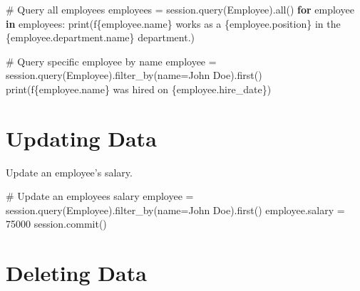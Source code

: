 \documentclass[
  letterpaper,
  DIV=11,
  numbers=noendperiod]{scrreprt}
\newenvironment{Shaded}{\begin{snugshade}}{\end{snugshade}}
\newcommand{\BuiltInTok}[1]{\textcolor[rgb]{0.00,0.23,0.31}{#1}}
\newcommand{\CommentTok}[1]{\textcolor[rgb]{0.37,0.37,0.37}{#1}}
\newcommand{\ControlFlowTok}[1]{\textcolor[rgb]{0.00,0.23,0.31}{\textbf{#1}}}
\newcommand{\DecValTok}[1]{\textcolor[rgb]{0.68,0.00,0.00}{#1}}
\newcommand{\KeywordTok}[1]{\textcolor[rgb]{0.00,0.23,0.31}{\textbf{#1}}}
\newcommand{\NormalTok}[1]{\textcolor[rgb]{0.00,0.23,0.31}{#1}}
\newcommand{\OperatorTok}[1]{\textcolor[rgb]{0.37,0.37,0.37}{#1}}
\newcommand{\SpecialCharTok}[1]{\textcolor[rgb]{0.37,0.37,0.37}{#1}}
\newcommand{\SpecialStringTok}[1]{\textcolor[rgb]{0.13,0.47,0.30}{#1}}
\newcommand{\StringTok}[1]{\textcolor[rgb]{0.13,0.47,0.30}{#1}}
\begin{document}
\begin{Shaded}
\begin{Highlighting}[]
\CommentTok{\# Query all employees}
\NormalTok{employees }\OperatorTok{=}\NormalTok{ session.query(Employee).}\BuiltInTok{all}\NormalTok{()}
\ControlFlowTok{for}\NormalTok{ employee }\KeywordTok{in}\NormalTok{ employees:}
    \BuiltInTok{print}\NormalTok{(}\SpecialStringTok{f\textquotesingle{}}\SpecialCharTok{\{}\NormalTok{employee}\SpecialCharTok{.}\NormalTok{name}\SpecialCharTok{\}}\SpecialStringTok{ works as a }\SpecialCharTok{\{}\NormalTok{employee}\SpecialCharTok{.}\NormalTok{position}\SpecialCharTok{\}}\SpecialStringTok{ in the }\SpecialCharTok{\{}\NormalTok{employee}\SpecialCharTok{.}\NormalTok{department}\SpecialCharTok{.}\NormalTok{name}\SpecialCharTok{\}}\SpecialStringTok{ department.\textquotesingle{}}\NormalTok{)}

\CommentTok{\# Query specific employee by name}
\NormalTok{employee }\OperatorTok{=}\NormalTok{ session.query(Employee).filter\_by(name}\OperatorTok{=}\StringTok{\textquotesingle{}John Doe\textquotesingle{}}\NormalTok{).first()}
\BuiltInTok{print}\NormalTok{(}\SpecialStringTok{f\textquotesingle{}}\SpecialCharTok{\{}\NormalTok{employee}\SpecialCharTok{.}\NormalTok{name}\SpecialCharTok{\}}\SpecialStringTok{ was hired on }\SpecialCharTok{\{}\NormalTok{employee}\SpecialCharTok{.}\NormalTok{hire\_date}\SpecialCharTok{\}}\SpecialStringTok{\textquotesingle{}}\NormalTok{)}
\end{Highlighting}
\end{Shaded}

\section{Updating Data}\label{updating-data-2}

Update an employee's salary.

\begin{Shaded}
\begin{Highlighting}[]
\CommentTok{\# Update an employee\textquotesingle{}s salary}
\NormalTok{employee }\OperatorTok{=}\NormalTok{ session.query(Employee).filter\_by(name}\OperatorTok{=}\StringTok{\textquotesingle{}John Doe\textquotesingle{}}\NormalTok{).first()}
\NormalTok{employee.salary }\OperatorTok{=} \DecValTok{75000}
\NormalTok{session.commit()}
\end{Highlighting}
\end{Shaded}

\section{Deleting Data}\label{deleting-data-2}
\end{document}
